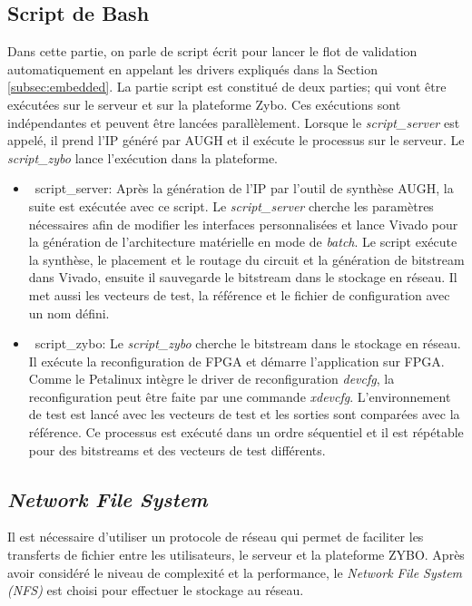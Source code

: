 \subsection{Script de Bash}
Dans cette partie, on parle de script écrit pour lancer le flot de validation automatiquement 
en appelant les drivers expliqués dans la Section \ref{subsec:embedded}.
La partie script est constitué de deux parties; qui vont être exécutées sur le serveur et 
sur la plateforme Zybo. Ces exécutions sont indépendantes et peuvent être
lancées parallèlement. Lorsque le \emph{script\_server} est appelé, il prend
l'IP généré par AUGH et il exécute le processus sur le serveur. Le \emph{script\_zybo}
lance l'exécution dans la plateforme.

\begin{itemize}
	\item\ script\_server:
	Après la génération de l'IP par l'outil de synthèse AUGH, la suite est exécutée avec ce script. Le \emph{script\_server}
	cherche les paramètres nécessaires afin de modifier les interfaces personnalisées et lance Vivado pour la génération
	de l'architecture matérielle en mode de \emph{batch}. Le script exécute la synthèse, le placement et le routage du circuit et 
	la génération de bitstream dans Vivado, ensuite il sauvegarde le bitstream dans le stockage en réseau.
	Il met aussi les vecteurs de test, la référence et le fichier de configuration avec un nom défini.

	\item\ script\_zybo:
	Le \emph{script\_zybo} cherche le bitstream dans le stockage en réseau. Il exécute la reconfiguration de FPGA et démarre
	l'application sur FPGA. Comme le Petalinux intègre le driver de reconfiguration \emph{devcfg}, la reconfiguration peut
	être faite par une commande \emph{xdevcfg}. L'environnement de test est lancé avec les vecteurs de test et les sorties
	sont comparées avec la référence. Ce processus est exécuté dans un ordre séquentiel et il est répétable pour des
	bitstreams et des vecteurs de test différents.
	
\end{itemize}

\subsection{\emph{Network File System}}

Il est nécessaire d'utiliser un protocole de réseau qui permet de faciliter les transferts de fichier entre les utilisateurs,
le serveur et la plateforme ZYBO. Après  avoir considéré le niveau de complexité et la performance, le \emph{Network File System (NFS)}
est choisi pour effectuer le stockage au réseau.

